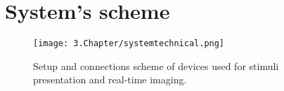 \section{System's scheme}
\label{sec:sectionb}

\begin{figure}[H]
	\centering
		\texttt{[image: 3.Chapter/systemtechnical.png]}
	\caption[c1]{Setup and connections scheme of devices used for stimuli presentation and real-time imaging.}
	\label{fig:systemtechnical}
\end{figure}